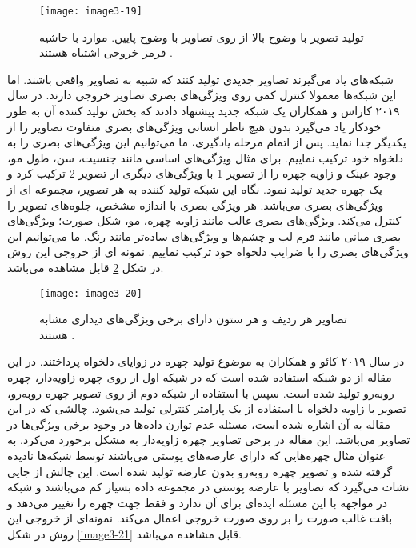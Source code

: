 \begin{figure}[h]
\centering
  \texttt{[image: image3-19]}
  \caption{
تولید تصویر با وضوح بالا از روی تصاویر با وضوح پایین. موارد با حاشیه قرمز خروجی اشتباه هستند
  \cite{BANERJEE2018246}.}
  \label{image3-19}
\end{figure}

\noindent
شبکه‌های  یاد می‌گیرند تصاویر جدیدی تولید کنند که شبیه به تصاویر واقعی باشند. اما این شبکه‌ها معمولا کنترل کمی روی ویژگی‌های بصری تصاویر خروجی دارند. در سال ۲۰۱۹ کاراس و همکاران \cite{karras2019stylebased} یک شبکه  جدید پیشنهاد دادند که بخش تولید کننده آن به طور خودکار یاد می‌گیرد بدون هیچ ناظر انسانی ویژگی‌های بصری متفاوت تصاویر را از یکدیگر جدا نماید. پس از اتمام مرحله یادگیری، ما می‌توانیم این ویژگی‌های بصری را به دلخواه خود ترکیب نماییم. برای مثال ویژگی‌های اساسی مانند جنسیت، سن، طول مو، وجود عینک و زاویه چهره را از تصویر 1 با ویژگی‌های دیگری از تصویر 2 ترکیب کرد و یک چهره جدید تولید نمود. نگاه این شبکه تولید کننده به هر تصویر، مجموعه ای از ویژگی‌های بصری می‌باشد. هر ویژگی بصری با اندازه مشخص، جلوه‌های تصویر را کنترل می‌کند. ویژگی‌های بصری غالب مانند زاویه چهره، مو، شکل صورت؛ ویژگی‌های بصری میانی مانند فرم لب و چشم‌ها و ویژگی‌های ساده‌تر مانند رنگ. ما می‌توانیم این ویژگی‌های بصری را با ضرایب دلخواه خود ترکیب نماییم. نمونه ای از خروجی این روش در شکل \ref{image3-20} قابل مشاهده می‌باشد.
 
\begin{figure}[h]
\centering
  \texttt{[image: image3-20]}
  \caption{
تصاویر هر ردیف و هر ستون دارای برخی ویژگی‌های دیداری مشابه هستند 
  \cite{karras2019stylebased}.}
  \label{image3-20}
\end{figure}

\noindent
در سال ۲۰۱۹ کائو و همکاران \cite{8603840} به موضوع تولید چهره در زوایای دلخواه پرداختند. در این مقاله از دو شبکه  استفاده شده است که در شبکه اول از روی چهره زاویه‌دار، چهره روبه‌رو تولید شده است. سپس با استفاده از شبکه  دوم از روی تصویر چهره روبه‌رو، تصویر با زاویه دلخواه با استفاده از یک پارامتر کنترلی تولید می‌شود. چالشی که در این مقاله به آن اشاره شده است، مسئله عدم توازن داده‌ها در وجود برخی ویژگی‌ها در تصاویر می‌باشد. این مقاله در برخی تصاویر چهره زاویه‌دار به مشکل برخورد می‌کرد. به عنوان مثال چهره‌هایی که دارای عارضه‌های پوستی می‌باشند توسط شبکه‌ها نادیده گرفته شده و تصویر چهره روبه‌رو بدون عارضه تولید شده است. این چالش از جایی نشات می‌گیرد که تصاویر با عارضه پوستی در مجموعه داده بسیار کم می‌باشند و شبکه در مواجهه با این مسئله ایده‌ای برای آن ندارد و فقط جهت چهره را تغییر می‌دهد و بافت غالب صورت را بر روی صورت خروجی اعمال می‌کند. نمونه‌ای از خروجی این روش در شکل \ref{image3-21} قابل مشاهده می‌باشد.

